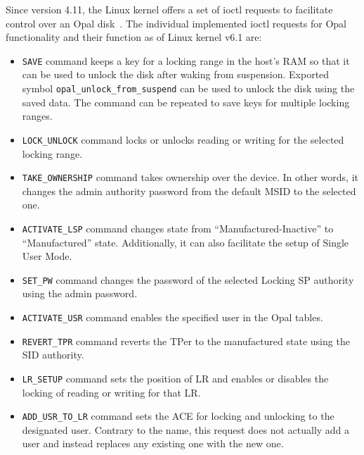 Since version 4.11, the Linux kernel offers a set of ioctl requests to facilitate control over an Opal disk~\cite{linux-opal-introduction-mail}. 
The individual implemented ioctl requests for Opal functionality and their function as of Linux kernel v6.1 are:
\begin{itemize}
\item \verb|SAVE| command keeps a key for a locking range in the host's RAM so that it can be used to unlock the disk after waking from suspension. Exported symbol \verb|opal_unlock_from_suspend| can be used to unlock the disk using the saved data. The command can be repeated to save keys for multiple locking ranges. %
\item \verb|LOCK_UNLOCK| command locks or unlocks reading or writing for the selected locking range.
\item \verb|TAKE_OWNERSHIP| command takes ownership over the device. In other words, it changes the admin authority password from the default MSID to the selected one. 
\item \verb|ACTIVATE_LSP| command changes state from ``Manufactured-Inactive'' to ``Manufactured'' state. Additionally, it can also facilitate the setup of Single User Mode. 
\item \verb|SET_PW| command changes the password of the selected Locking SP authority using the admin password.
\item \verb|ACTIVATE_USR| command enables the specified user in the Opal tables.
\item \verb|REVERT_TPR| command reverts the TPer to the manufactured state using the SID authority.
\item \verb|LR_SETUP| command sets the position of LR and enables or disables the locking of reading or writing for that LR.
\item \verb|ADD_USR_TO_LR| command sets the ACE for locking and unlocking to the designated user. Contrary to the name, this request does not actually add a user and instead replaces any existing one with the new one. %

\end{itemize}
